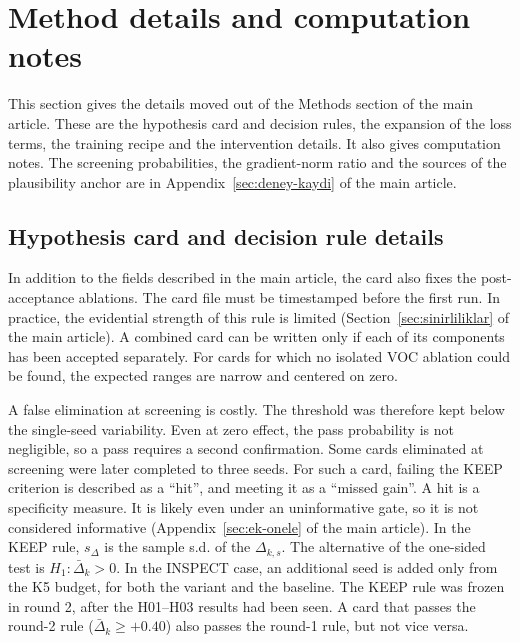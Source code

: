 \setcounter{table}{0}\setcounter{figure}{0}
\section{Method details and computation notes}\label{sec:ek-hesap}

This section gives the details moved out of the Methods section of the main article. These are the hypothesis card and decision rules, the expansion of the loss terms, the training recipe and the intervention details. It also gives computation notes. The screening probabilities, the gradient-norm ratio and the sources of the plausibility anchor are in Appendix~\ref{sec:deney-kaydi} of the main article.

\subsection{Hypothesis card and decision rule details}\label{sec:ek-kart}
In addition to the fields described in the main article, the card also fixes the post-acceptance ablations. The card file must be timestamped before the first run. In practice, the evidential strength of this rule is limited (Section~\ref{sec:sinirliliklar} of the main article). A combined card can be written only if each of its components has been accepted separately. For cards for which no isolated VOC ablation could be found, the expected ranges are narrow and centered on zero.

A false elimination at screening is costly. The threshold was therefore kept below the single-seed variability. Even at zero effect, the pass probability is not negligible, so a pass requires a second confirmation. Some cards eliminated at screening were later completed to three seeds. For such a card, failing the KEEP criterion is described as a ``hit'', and meeting it as a ``missed gain''. A hit is a specificity measure. It is likely even under an uninformative gate, so it is not considered informative (Appendix~\ref{sec:ek-onele} of the main article). In the KEEP rule, $s_\Delta$ is the sample s.d. of the $\Delta_{k,s}$. The alternative of the one-sided test is $H_1:\bar\Delta_k>0$. In the INSPECT case, an additional seed is added only from the K5 budget, for both the variant and the baseline. The KEEP rule was frozen in round 2, after the H01--H03 results had been seen. A card that passes the round-2 rule ($\bar\Delta_k\ge+0.40$) also passes the round-1 rule, but not vice versa.

